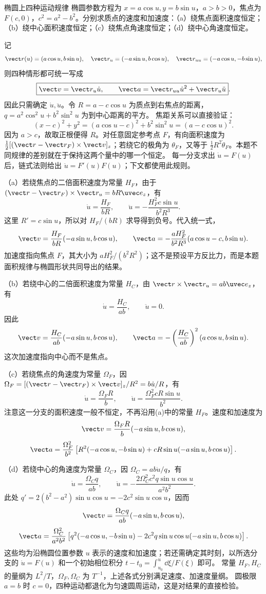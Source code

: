 \begin{practicebox}{椭圆上四种运动规律}
椭圆参数方程为 $x=a\cos u, y=b\sin u$，$a>b>0$，焦点为 $F(c,0)$，$c^2=a^2-b^2$。分别求质点的速度和加速度：（a）绕焦点面积速度恒定；（b）绕中心面积速度恒定；（c）绕焦点角速度恒定；（d）绕中心角速度恒定。
\label{r2ch01:pr:004}
\begin{solution}
记
\[
  \vect r(u)=(a\cos u,b\sin u),\quad
  \vect r_u=(-a\sin u,b\cos u),\quad
  \vect r_{uu}=(-a\cos u,-b\sin u),
\]
则四种情形都可统一写成
\[
  \boxed{\vect v=\vect r_u\dot u,\qquad
  \vect a=\vect r_{uu}\dot u^2+\vect r_u\ddot u}.
\]
因此只需确定 $\dot u,\ddot u$。令 $R=a-c\cos u$ 为质点到右焦点的距离，$q=a^2\cos^2u+b^2\sin^2u$ 为到中心距离的平方。
焦距关系可以直接验证：
\[
 (x-c)^2+y^2=(a\cos u-c)^2+b^2\sin^2u=(a-c\cos u)^2.
\]
因为 $a>c$，故取正根便得 $R$。对任意固定参考点 $F$，有向面积速度为
$\tfrac12[(\vect r-\vect r_F)\times\vect v]_z$；若绕它的极角为 $\theta_F$，又等于
$\tfrac12R^2\dot\theta_F$。本题不同规律的差别就在于保持这两个量中的哪一个恒定。
每一分支求出 $\dot u=F(u)$ 后，链式法则给出 $\ddot u=F'(u)F(u)$；下文都使用此规则。

（a）若绕焦点的二倍面积速度为常量 $H_F$，由于
$(\vect r-\vect r_F)\times\vect r_u=bR\uvec e_z$，有
\[
  \dot u=\frac{H_F}{bR},\qquad
  \ddot u=-\frac{H_F^2c\sin u}{b^2R^3}.
\]
这里 $R'=c\sin u$，所以对 $H_F/(bR)$ 求导得到负号。代入统一式，
\[
 \vect v=\frac{H_F}{bR}(-a\sin u,b\cos u),\qquad
 \vect a=-\frac{aH_F^2}{b^2R^3}(a\cos u-c,b\sin u).
\]
加速度指向焦点 $F$，其大小为 $aH_F^2/(b^2R^2)$；这不是预设平方反比力，而是本题面积规律与椭圆形状共同导出的结果。

（b）若绕中心的二倍面积速度为常量 $H_C$，由
$\vect r\times\vect r_u=ab\uvec e_z$，有
\[
  \dot u=\frac{H_C}{ab},\qquad \ddot u=0.
\]
因此
\[
 \vect v=\frac{H_C}{ab}(-a\sin u,b\cos u),\qquad
 \vect a=-\left(\frac{H_C}{ab}\right)^2(a\cos u,b\sin u).
\]
这次加速度指向中心而不是焦点。

（c）若绕焦点的角速度为常量 $\Omega_F$，因
$\Omega_F=[(\vect r-\vect r_F)\times\vect v]_z/R^2=b\dot u/R$，有
\[
  \dot u=\frac{\Omega_FR}{b},\qquad
  \ddot u=\frac{\Omega_F^2cR\sin u}{b^2}.
\]
注意这一分支的面积速度一般不恒定，不再沿用(a)中的常量 $H_F$。速度和加速度为
\[
 \vect v=\frac{\Omega_FR}{b}(-a\sin u,b\cos u),
\]
\[
 \vect a=\frac{\Omega_F^2}{b^2}
 \left[R^2(-a\cos u,-b\sin u)+cR\sin u(-a\sin u,b\cos u)\right].
\]

（d）若绕中心的角速度为常量 $\Omega_C$，因
$\Omega_C=ab\dot u/q$，有
\[
  \dot u=\frac{\Omega_Cq}{ab},\qquad
  \ddot u=-\frac{2\Omega_C^2c^2q\sin u\cos u}{a^2b^2}.
\]
此处 $q'=2(b^2-a^2)\sin u\cos u=-2c^2\sin u\cos u$，因而
\[
 \vect v=\frac{\Omega_Cq}{ab}(-a\sin u,b\cos u),
\]
\[
 \vect a=\frac{\Omega_C^2}{a^2b^2}
 \left[q^2(-a\cos u,-b\sin u)-2c^2q\sin u\cos u(-a\sin u,b\cos u)\right].
\]
这些均为沿椭圆位置参数 $u$ 表示的速度和加速度；若还需确定其时刻，以所选分支的
$\dot u=F(u)$ 和一个初始相位积分 $t-t_0=\int_{u_0}^{u}\dd\xi/F(\xi)$ 即可。
常量 $H_F,H_C$ 的量纲为 $L^2/T$，$\Omega_F,\Omega_C$ 为 $T^{-1}$，上述各式分别满足速度、加速度量纲。
圆极限 $a=b$ 时 $c=0$，四种运动都退化为匀速圆周运动，这是对结果的直接检验。
\end{solution}
\end{practicebox}


